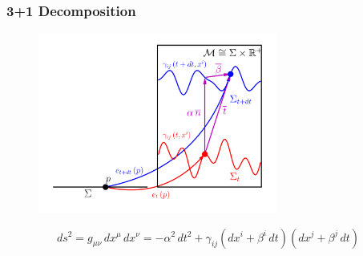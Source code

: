 \documentclass{beamer}
\begin{document}
\begin{frame}
\frametitle{3+1 Decomposition}

  \begin{figure}[htb!]
    \centering
    \includegraphics[width=0.7\textwidth]{fig.1p1.png}
  \end{figure}

  \vspace{-2em}

  \begin{equation*}
    ds^{2}
    =g_{\mu\nu}\,dx^{\mu}\,dx^{\nu}
    =-\alpha^{2}\,dt^{2}
     +\gamma_{ij}\left(dx^{i}+\beta^{i}\,dt\right)
                 \left(dx^{j}+\beta^{j}\,dt\right)
  \end{equation*}

\end{frame}
\end{document}
